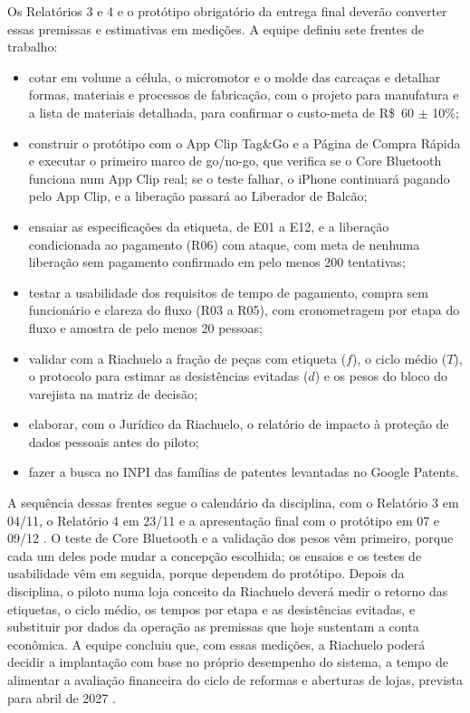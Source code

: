 Os Relatórios 3 e 4 e o protótipo obrigatório da entrega final deverão converter essas premissas e estimativas em medições. A equipe definiu sete frentes de trabalho:
\begin{itemize}
    \item cotar em volume a célula, o micromotor e o molde das carcaças e detalhar formas, materiais e processos de fabricação, com o projeto para manufatura e a lista de materiais detalhada, para confirmar o custo-meta de R\$~60 $\pm$ 10\%;
    \item construir o protótipo com o App Clip Tag\&Go e a Página de Compra Rápida e executar o primeiro marco de go/no-go, que verifica se o Core Bluetooth funciona num App Clip real; se o teste falhar, o iPhone continuará pagando pelo App Clip, e a liberação passará ao Liberador de Balcão;
    \item ensaiar as especificações da etiqueta, de E01 a E12, e a liberação condicionada ao pagamento (R06) com ataque, com meta de nenhuma liberação sem pagamento confirmado em pelo menos 200 tentativas;
    \item testar a usabilidade dos requisitos de tempo de pagamento, compra sem funcionário e clareza do fluxo (R03 a R05), com cronometragem por etapa do fluxo e amostra de pelo menos 20 pessoas;
    \item validar com a Riachuelo a fração de peças com etiqueta ($f$), o ciclo médio ($T$), o protocolo para estimar as desistências evitadas ($d$) e os pesos do bloco do varejista na matriz de decisão;
    \item elaborar, com o Jurídico da Riachuelo, o relatório de impacto à proteção de dados pessoais antes do piloto;
    \item fazer a busca no INPI das famílias de patentes levantadas no Google Patents.
\end{itemize}

A sequência dessas frentes segue o calendário da disciplina, com o Relatório 3 em 04/11, o Relatório 4 em 23/11 e a apresentação final com o protótipo em 07 e 09/12 \cite{zancul2026conceitual}. O teste de Core Bluetooth e a validação dos pesos vêm primeiro, porque cada um deles pode mudar a concepção escolhida; os ensaios e os testes de usabilidade vêm em seguida, porque dependem do protótipo. Depois da disciplina, o piloto numa loja conceito da Riachuelo deverá medir o retorno das etiquetas, o ciclo médio, os tempos por etapa e as desistências evitadas, e substituir por dados da operação as premissas que hoje sustentam a conta econômica. A equipe concluiu que, com essas medições, a Riachuelo poderá decidir a implantação com base no próprio desempenho do sistema, a tempo de alimentar a avaliação financeira do ciclo de reformas e aberturas de lojas, prevista para abril de 2027 \cite{economicnews2026riachuelo}.
